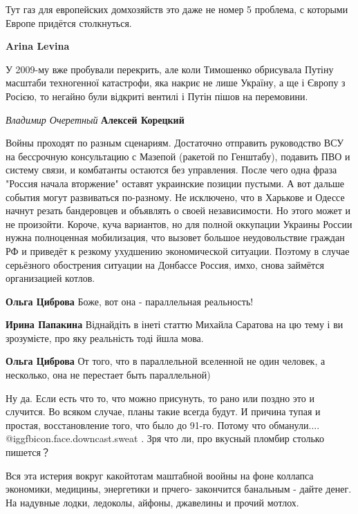 \begin{itemize}
\begin{itemize}
Тут газ для европейских домхозяйств это даже не номер 5 проблема, с которыми
Европе придётся столкнуться.


\textbf{Arina Levina} 

У 2009-му вже пробували перекрить, але коли Тимошенко обрисувала Путіну
масштаби техногенної катастрофи, яка накриє не лише Україну, а ще і Європу з
Росією, то негайно були відкриті вентилі і Путін пішов на перемовини.

\emph{Владимир Очеретный}
\textbf{Алексей Корецкий} 

Войны проходят по разным сценариям. Достаточно отправить руководство ВСУ на
бессрочную консультацию с Мазепой (ракетой по Генштабу), подавить ПВО и систему
связи, и комбатанты остаются без управления. После чего одна фраза "Россия
начала вторжение" оставят украинские позиции пустыми. А вот дальше события
могут развиваться по-разному. Не исключено, что в Харькове и Одессе начнут
резать бандеровцев и объявлять о своей независимости. Но этого может и не
произойти. Короче, куча вариантов, но для полной оккупации Украины России нужна
полноценная мобилизация, что вызовет большое неудовольствие граждан РФ и
приведёт к резкому ухудшению экономической ситуации. Поэтому в случае
серьёзного обострения ситуации на Донбассе Россия, имхо, снова займётся
организацией котлов.

\textbf{Ольга Циброва}
Боже, вот она - параллельная реальность!

\textbf{Ирина Папакина} Віднайдіть в інеті статтю Михайла Саратова на цю тему і ви зрозумієте, про яку реальність тоді йшла мова.

\textbf{Ольга Циброва} От того, что в параллельной вселенной не один человек, а несколько, она не перестает быть параллельной)
\end{itemize} %


Ну да. Если есть что то, что можно присунуть, то рано или поздно это и
случится. Во всяком случае, планы такие всегда будут. И причина тупая и
простая, восстановление того, что было до 91-го. Потому что обманули.... @igg{fbicon.face.downcast.sweat} . Зря
что ли, про вкусный пломбир столько пишется？


Вся эта истерия вокруг какойтотам маштабной воойны на фоне коллапса экономики,
медицины, энергетики и прчего- закончится банальным - дайте денег. На надувные
лодки, ледоколы, айфоны, джавелины и прочий мотлох.


\end{itemize}

